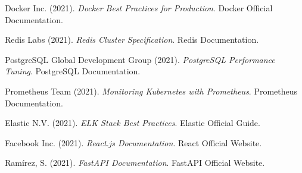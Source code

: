 \documentclass[12pt,a4paper]{report}
\begin{document}
\begin{thebibliography}{50}
Docker Inc. (2021). \textit{Docker Best Practices for Production}. Docker Official Documentation.

Redis Labs (2021). \textit{Redis Cluster Specification}. Redis Documentation.

PostgreSQL Global Development Group (2021). \textit{PostgreSQL Performance Tuning}. PostgreSQL Documentation.

Prometheus Team (2021). \textit{Monitoring Kubernetes with Prometheus}. Prometheus Documentation.

Elastic N.V. (2021). \textit{ELK Stack Best Practices}. Elastic Official Guide.

Facebook Inc. (2021). \textit{React.js Documentation}. React Official Website.

Ramírez, S. (2021). \textit{FastAPI Documentation}. FastAPI Official Website.

\end{thebibliography}
\end{document}
